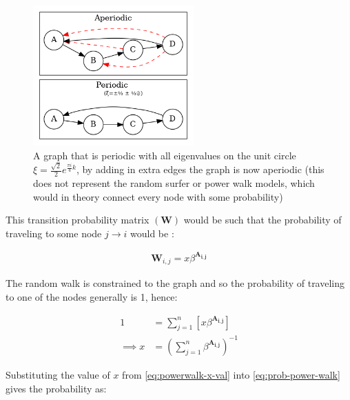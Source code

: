 \documentclass[11pt, twoside]{report}
\begin{document}
 \begin{figure}
 \includegraphics[width=0.55\textwidth]{media/dot/aperiodic.dot.png}
 \caption{\label{fig:aperiodic}A graph that is periodic with all eigenvalues on the unit circle \(\xi = \frac{\sqrt{2}}{2} e^{\frac{\pi i}{4} k}\), by adding in extra edges the graph is now aperiodic (this does not represent the random surfer or power walk models, which would in theory connect every node with some probability)}
\end{figure}

This transition probability matrix \(\left( \mathbf{W}\right)\) would be such that the probability of
traveling to some node \(j \rightarrow i\) would be \cite{parkPowerWalkRevisiting2013}:

\begin{align}
\mathbf{W}_{i, j} = x\beta^{\mathbf{A_{i,j}}} \label{eq:prob-power-walk}
\end{align}

The random walk is constrained to the graph and so the probability of traveling
to one of the nodes generally is 1, hence:


\begin{align}
      1 &= \sum^{n}_{j= 1}   \left[ x \beta^{\mathbf{A_{i,j}}} \right] \\
       \implies  x&= \left( \sum^{n}_{j= 1}   \beta^{\mathbf{A_{i,j}}}
       \right)^{-1} \label{eq:powerwalk-x-val}
\end{align}

Substituting the value of \(x\) from \eqref{eq:powerwalk-x-val} into \eqref{eq:prob-power-walk} gives the probability as:

\begin{align}
\end{align}
\end{document}
